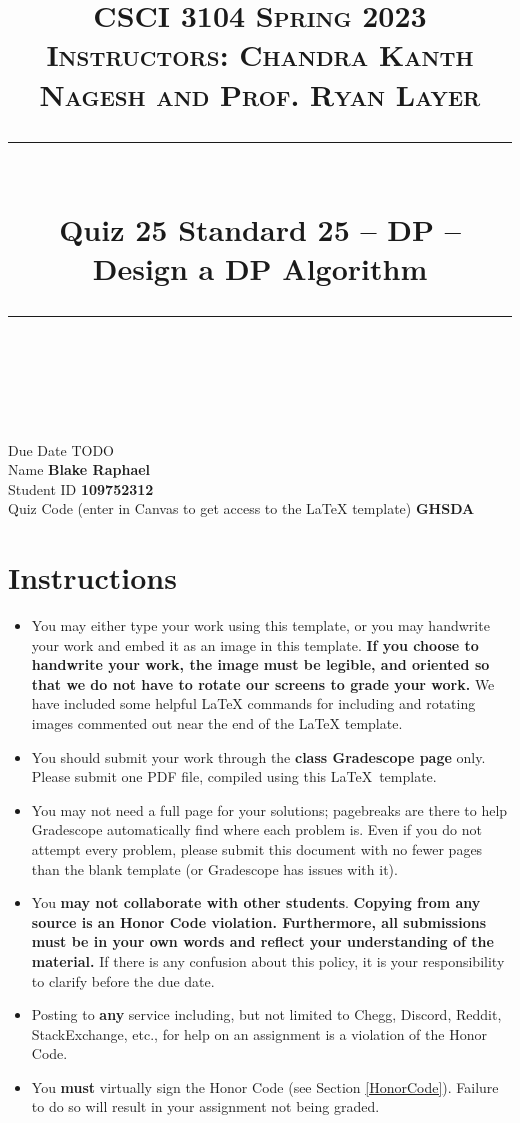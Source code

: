 \documentclass[11pt]{article}
\title{
\normalfont \normalsize 
\textsc{CSCI 3104 Spring 2023 \\ 
Instructors: Chandra Kanth Nagesh and Prof. Ryan Layer} \\
[10pt] 
\rule{\linewidth}{0.5pt} \\[6pt] 
\huge Quiz 25 Standard 25 --  DP -- Design a DP Algorithm \\
\rule{\linewidth}{2pt}  \\[10pt]
}
\date{}
\theoremstyle{definition}
\theoremstyle{definition}
\theoremstyle{definition}
\begin{document}

\maketitle


\noindent
Due Date \dotfill TODO \\
Name \dotfill \textbf{Blake Raphael} \\
Student ID \dotfill \textbf{109752312} \\
Quiz Code (enter in Canvas to get access to the LaTeX template) \dotfill \textbf{GHSDA}


\tableofcontents

\section*{Instructions}
 \begin{itemize}
	\item You may either type your work using this template, or you may handwrite your work and embed it as an image in this template. \textbf{If you choose to handwrite your work, the image must be legible, and oriented so that we do not have to rotate our screens to grade your work.} We have included some helpful LaTeX commands for including and rotating images commented out near the end of the LaTeX template.
	\item You should submit your work through the \textbf{class Gradescope page} only. Please submit one PDF file, compiled using this \LaTeX \ template.
	\item You may not need a full page for your solutions; pagebreaks are there to help Gradescope automatically find where each problem is. Even if you do not attempt every problem, please submit this document with no fewer pages than the blank template (or Gradescope has issues with it).

	\item You \textbf{may not collaborate with other students}. \textbf{Copying from any source is an Honor Code violation. Furthermore, all submissions must be in your own words and reflect your understanding of the material.} If there is any confusion about this policy, it is your responsibility to clarify before the due date. 

	\item Posting to \textbf{any} service including, but not limited to Chegg, Discord, Reddit, StackExchange, etc., for help on an assignment is a violation of the Honor Code.

	\item You \textbf{must} virtually sign the Honor Code (see Section \ref{HonorCode}). Failure to do so will result in your assignment not being graded.
\end{itemize}
\end{document}
